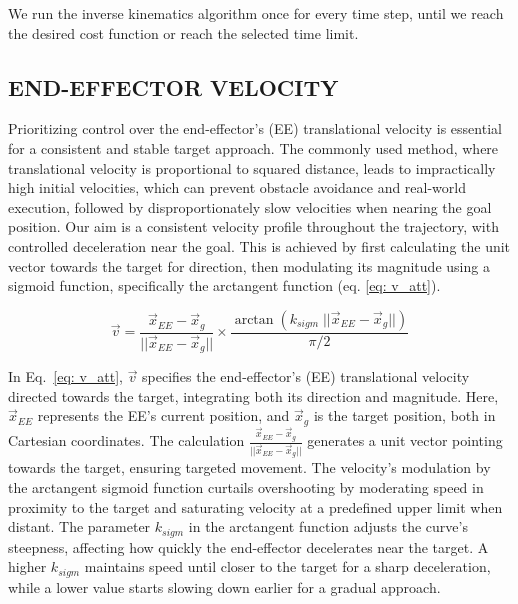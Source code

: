\documentclass[letterpaper, 10 pt, conference]{ieeeconf}  %
\begin{document}
We run the inverse kinematics algorithm once for every time step, until we reach the desired cost function or reach the selected time limit. 

\subsection{END-EFFECTOR VELOCITY}

Prioritizing control over the end-effector's (EE) translational velocity is essential for a consistent and stable target approach. The commonly used method, where translational velocity is proportional to squared distance, leads to impractically high initial velocities, which can prevent obstacle avoidance and real-world execution, followed by disproportionately slow velocities when nearing the goal position. Our aim is a consistent velocity profile throughout the trajectory, with controlled deceleration near the goal. This is achieved by first calculating the unit vector towards the target for direction, then modulating its magnitude using a sigmoid function, specifically the arctangent function (eq. \ref{eq: v_att}).

\begin{equation} 
	\vec{v} = \frac{\vec{x}_{EE} - \vec{x}_g}{||\vec{x}_{EE} - \vec{x}_g||} \times \frac{\arctan(k_{sigm} \; ||\vec{x}_{EE} - \vec{x}_g||) }{\pi/2}
	\label{eq: v_att}
\end{equation}

In Eq.~\ref{eq: v_att}, $\vec{v}$ specifies the end-effector's (EE) translational velocity directed towards the target, integrating both its direction and magnitude. Here, $\vec{x}_{EE}$ represents the EE's current position, and $\vec{x}_g$ is the target position, both in Cartesian coordinates. The calculation $\frac{\vec{x}_{EE}-\vec{x}_g}{||\vec{x}_{EE}-\vec{x}_g||}$ generates a unit vector pointing towards the target, ensuring targeted movement. The velocity's modulation by the arctangent sigmoid function curtails overshooting by moderating speed in proximity to the target and saturating velocity at a predefined upper limit when distant. The parameter \(k_{sigm}\) in the arctangent function adjusts the curve's steepness, affecting how quickly the end-effector decelerates near the target. A higher \(k_{sigm}\) maintains speed until closer to the target for a sharp deceleration, while a lower value starts slowing down earlier for a gradual approach. 
\end{document}
